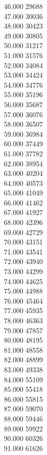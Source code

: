 { 46.000	29688 \\
 47.000	30036 \\
 48.000	30423 \\
 49.000	30805 \\
 50.000	31217 \\
 51.000	31576 \\
 52.000	34084 \\
 53.000	34424 \\
 54.000	34776 \\
 55.000	35196 \\
 56.000	35687 \\
 57.000	36076 \\
 58.000	36507 \\
 59.000	36984 \\
 60.000	37449 \\
 61.000	37782 \\
 62.000	38954 \\
 63.000	40204 \\
 64.000	40573 \\
 65.000	41049 \\
 66.000	41462 \\
 67.000	41927 \\
 68.000	42396 \\
 69.000	42729 \\
 70.000	43151 \\
 71.000	43541 \\
 72.000	43940 \\
 73.000	44299 \\
 74.000	44625 \\
 75.000	44988 \\
 76.000	45464 \\
 77.000	45935 \\
 78.000	46363 \\
 79.000	47857 \\
 80.000	48195 \\
 81.000	48558 \\
 82.000	48899 \\
 83.000	49338 \\
 84.000	55109 \\
 85.000	55418 \\
 86.000	55815 \\
 87.000	59070 \\
 88.000	59446 \\
 89.000	59922 \\
 90.000	60326 \\
 91.000	61626 \\
}
